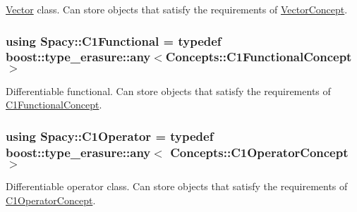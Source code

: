 \hyperlink{classSpacy_1_1Vector}{Vector} class. Can store objects that satisfy the requirements of \hyperlink{group__ConceptGroup_gad6958389d1fa2758a8a64a0a24c36004_VectorConceptAnchor}{Vector\+Concept}. 

\label{group__SpacyGroup_gafc144d2730ef87a67e54f8cd750b1f54_VectorAnchor}%
\hypertarget{group__SpacyGroup_gafc144d2730ef87a67e54f8cd750b1f54_VectorAnchor}{}%
\hypertarget{group__SpacyGroup_gaa7cb8ef6c287b0af0352d3dd0eb9f200_gaa7cb8ef6c287b0af0352d3dd0eb9f200}{}
\subsubsection[{C1\+Functional}]{\setlength{\rightskip}{0pt plus 5cm}using {\bf Spacy\+::\+C1\+Functional} = typedef boost\+::type\+\_\+erasure\+::any$<$Concepts\+::\+C1\+Functional\+Concept$>$}\label{group__SpacyGroup_gaa7cb8ef6c287b0af0352d3dd0eb9f200_gaa7cb8ef6c287b0af0352d3dd0eb9f200}


Differentiable functional. Can store objects that satisfy the requirements of \hyperlink{group__ConceptGroup_ga205b55d8291e0f2e143f116cf78bc54f_C1FunctionalConceptAnchor}{C1\+Functional\+Concept}. 

\label{group__SpacyGroup_gaa7cb8ef6c287b0af0352d3dd0eb9f200_C1FunctionalAnchor}%
\hypertarget{group__SpacyGroup_gaa7cb8ef6c287b0af0352d3dd0eb9f200_C1FunctionalAnchor}{}%
\hypertarget{group__SpacyGroup_ga87ae8cb0d7a567a4bb181e0a9f182620_ga87ae8cb0d7a567a4bb181e0a9f182620}{}
\subsubsection[{C1\+Operator}]{\setlength{\rightskip}{0pt plus 5cm}using {\bf Spacy\+::\+C1\+Operator} = typedef boost\+::type\+\_\+erasure\+::any$<$ Concepts\+::\+C1\+Operator\+Concept $>$}\label{group__SpacyGroup_ga87ae8cb0d7a567a4bb181e0a9f182620_ga87ae8cb0d7a567a4bb181e0a9f182620}


Differentiable operator class. Can store objects that satisfy the requirements of \hyperlink{group__ConceptGroup_ga14a12c741dc237e32862fa4bc315451b_C1OperatorConceptAnchor}{C1\+Operator\+Concept}. 

\label{group__SpacyGroup_ga87ae8cb0d7a567a4bb181e0a9f182620_C1OperatorAnchor}%
\hypertarget{group__SpacyGroup_ga87ae8cb0d7a567a4bb181e0a9f182620_C1OperatorAnchor}{}%
\hypertarget{group__SpacyGroup_gaf5b89e117806134b06a1ce4629fb2b65_gaf5b89e117806134b06a1ce4629fb2b65}{}
